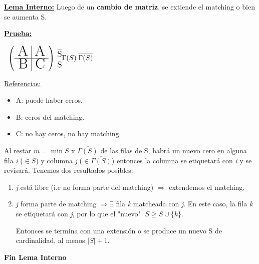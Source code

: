 \documentclass[12pt,a4paper]{report}
\begin{document}
\begin{enumerate}
					\underline{\textbf{Lema Interno:}} Luego de un \textbf{cambio de matriz}, se extiende el matching o bien se aumenta S.
						\par \underline{\textbf{Prueba:}}
						\begin{center}$
							\; \; \left(
							\begin{array}{r | r}
								\text{{\huge A}} & \text{{\huge A}} \\
								\hline
								\text{{\huge B}} & \text{{\huge C}}
							\end{array}
							\right)
							{\begin{subarray}{l} \; \overline{\text{{\large S}}} \\ \\ \; {\text{{\large S}}} \end{subarray}} \linebreak
							\Gamma(S) \; \overline{\Gamma(S)}
							$
						\end{center}

						\underline{Referencias:}
						\begin{itemize}
							\item A: puede haber ceros.
							\item B: ceros del matching.
							\item C: no hay ceros, no hay matching.
						\end{itemize}

						\par Al restar $\textit{m} = \min S$ x $\overline{\Gamma(S)}$ de las filas de S, habrá un nuevo cero en alguna fila \textit{i} ($\in S$) y columna \textit{j} ($\in \overline{\Gamma(S)}$) entonces la columna se etiquetará con \textit{i} y se revisará.
						Tenemos dos resultados posibles:
						\begin{enumerate}
							\item \textit{j} está libre (i.e no forma parte del matching) $\Rightarrow$ extendemos el matching.
							\item \textit{j} forma parte de matching $\Rightarrow \exists$ fila \textit{k} matcheada con \textit{j}. En este caso, la fila \textit{k} se etiquetará con \textit{j}, por lo que el "nuevo" $\; S \geq S \cup \{\textit{k}\}$.

							\vspace{5mm}
							\par Entonces se termina con una extensión o se produce un nuevo S de cardinalidad, al menos $\lvert S \rvert + 1$.
						\end{enumerate}
					\textbf{Fin Lema Interno}


\end{enumerate}
\end{document}
